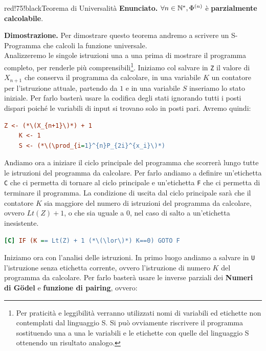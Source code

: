 \newpage
\begin{halfframedbox}{red!75!black}{Teorema di Universalità}\label{Teorema di Universalità}
  \textbf{Enunciato. } \(\forall n \in \mathbb{N}^*, \Phi^{(n)}\) è \textbf{parzialmente calcolabile}.

  \begin{center}
    \textcolor{red!75!black}{\hdashrule[0.5ex]{18cm}{1pt}{3mm 3pt 1mm 2pt}}
  \end{center}

  \textbf{Dimostrazione. } Per dimostrare questo teorema andremo a scrivere un S-Programma che calcoli la funzione universale.\\
  Analizzeremo le singole istruzioni una a una prima di mostrare il programma completo, per renderle più comprensibili\footnote{Per praticità e leggibilità verranno utilizzati nomi di variabili ed etichette non contemplati dal linguaggio S. Si può ovviamente riscrivere il programma sostituendo una a una le variabili e le etichette con quelle del linguaggio S ottenendo un risultato analogo.}.
  Iniziamo col salvare in \lstinline{Z} il valore di \(X_{n+1}\) che conserva il programma da calcolare, in una variabile \(K\) un contatore per l'istruzione attuale, partendo da \(1\) e in una variabile \(S\) inseriamo lo stato iniziale. Per farlo basterà usare la codifica degli stati ignorando tutti i posti dispari poiché le variabili di input si trovano solo in posti pari. Avremo quindi:
  \begin{lstlisting}[language=ini, caption={ }]
    Z <- (*\(X_{n+1}\)*) + 1
    K <- 1
    S <- (*\(\prod_{i=1}^{n}P_{2i}^{x_i}\)*)
  \end{lstlisting}
  Andiamo ora a iniziare il ciclo principale del programma che scorrerà lungo tutte le istruzioni del programma da calcolare. Per farlo andiamo a definire un'etichetta \lstinline{C} che ci permetta di tornare al ciclo principale e un'etichetta \lstinline{F} che ci permetta di terminare il programma. La condizione di uscita dal ciclo principale sarà che il contatore \(K\) sia maggiore del numero di istruzioni del programma da calcolare, ovvero \(Lt(Z)+1\), o che sia uguale a \(0\), nel caso di salto a un'etichetta inesistente.
  \begin{lstlisting}[language=ini, caption={ }]
    [C] IF (K == Lt(Z) + 1 (*\(\lor\)*) K==0) GOTO F
  \end{lstlisting}
  Iniziamo ora con l'analisi delle istruzioni. In primo luogo andiamo a salvare in \lstinline{U} l'istruzione senza etichetta corrente, ovvero l'istruzione di numero \(K\) del programma da calcolare. Per farlo basterà usare le inverse parziali dei \textbf{Numeri di Gödel} e \textbf{funzione di pairing}, ovvero:

\end{halfframedbox}
